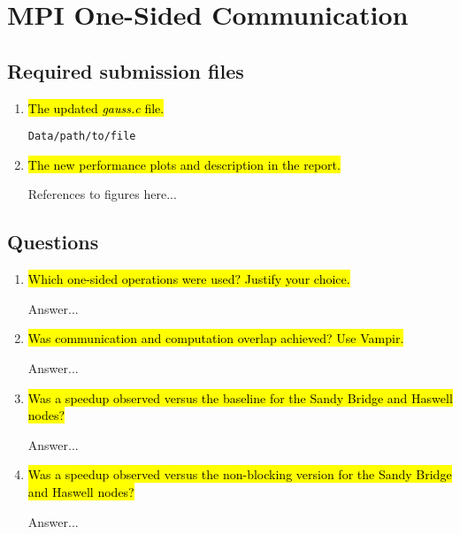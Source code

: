\section{MPI One-Sided Communication}
\subsection{Required submission files}
\begin{enumerate}
	\item \hl{The updated \emph{gauss.c} file.}

		\verb!Data/path/to/file!

	\item \hl{The new performance plots and description in the report.}

		References to figures here...

\end{enumerate}

\subsection{Questions}
\begin{enumerate}
	\item \hl{Which one-sided operations were used? Justify your choice.}

	Answer...

	\item \hl{Was communication and computation overlap achieved? Use Vampir.}

	Answer...

	\item \hl{Was a speedup observed versus the baseline for the Sandy Bridge and Haswell nodes?}

	Answer...

	\item \hl{Was a speedup observed versus the non-blocking version for the Sandy Bridge and Haswell nodes?}

	Answer...

\end{enumerate}
